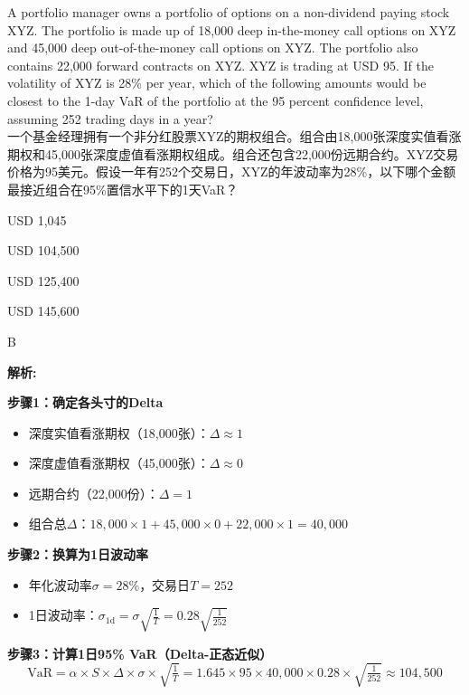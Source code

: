 \documentclass{article}
\newcounter{question} %
\newenvironment{explanation}
{\textbf{解析:}\par}
{\par}
\begin{document}
\begin{question}
    A portfolio manager owns a portfolio of options on a non-dividend paying stock XYZ. The portfolio is made up of 18,000 deep in-the-money call options on XYZ and 45,000 deep out-of-the-money call options on XYZ. The portfolio also contains 22,000 forward contracts on XYZ. XYZ is trading at USD 95. If the volatility of XYZ is 28\% per year, which of the following amounts would be closest to the 1-day VaR of the portfolio at the 95 percent confidence level, assuming 252 trading days in a year?
    \\一个基金经理拥有一个非分红股票XYZ的期权组合。组合由18,000张深度实值看涨期权和45,000张深度虚值看涨期权组成。组合还包含22,000份远期合约。XYZ交易价格为95美元。假设一年有252个交易日，XYZ的年波动率为28\%，以下哪个金额最接近组合在95\%置信水平下的1天VaR？
\end{question}

\begin{choices}
    \item USD 1,045
    \item USD 104,500
    \item USD 125,400
    \item USD 145,600
\end{choices}

\begin{correctanswer}
    B
\end{correctanswer}

\begin{explanation}

       \textbf{步骤1：确定各头寸的Delta}
        \begin{itemize}
            \item 深度实值看涨期权（18{,}000张）：$\Delta \approx 1$
            \item 深度虚值看涨期权（45{,}000张）：$\Delta \approx 0$
            \item 远期合约（22{,}000份）：$\Delta = 1$
            \item 组合总$\Delta$：$18{,}000\times1 + 45{,}000\times0 + 22{,}000\times1 = 40{,}000$
        \end{itemize}

         \textbf{步骤2：换算为1日波动率}
        \begin{itemize}
            \item 年化波动率$\sigma=28\%$，交易日$T=252$
            \item 1日波动率：$\sigma_{\text{1d}}=\sigma\sqrt{\tfrac{1}{T}}=0.28\sqrt{\tfrac{1}{252}}$
        \end{itemize}

        \textbf{步骤3：计算1日95\% VaR（Delta-正态近似）}
        \[
        \text{VaR}
        = \alpha \times S \times \Delta \times \sigma \times \sqrt{\tfrac{1}{T}}
        = 1.645 \times 95 \times 40{,}000 \times 0.28 \times \sqrt{\tfrac{1}{252}}
        \approx 104{,}500
        \]

 
   

\end{explanation}
\end{document}
